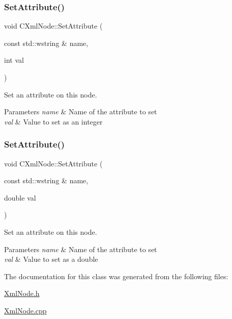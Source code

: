 \subsubsection{\texorpdfstring{Set\+Attribute()}{SetAttribute()}\hspace{0.1cm}{\footnotesize\ttfamily [2/3]}}
{\footnotesize\ttfamily void C\+Xml\+Node\+::\+Set\+Attribute (\begin{DoxyParamCaption}\item[{const std\+::wstring \&}]{name,  }\item[{int}]{val }\end{DoxyParamCaption})}



Set an attribute on this node. 


\begin{DoxyParams}{Parameters}
{\em name} & Name of the attribute to set \\
\hline
{\em val} & Value to set as an integer \\
\hline
\end{DoxyParams}
\mbox{\label{classxmlnode_1_1_c_xml_node_a1bfd97eb8de5e6f769b5ed29039b91ea}} 
\subsubsection{\texorpdfstring{Set\+Attribute()}{SetAttribute()}\hspace{0.1cm}{\footnotesize\ttfamily [3/3]}}
{\footnotesize\ttfamily void C\+Xml\+Node\+::\+Set\+Attribute (\begin{DoxyParamCaption}\item[{const std\+::wstring \&}]{name,  }\item[{double}]{val }\end{DoxyParamCaption})}



Set an attribute on this node. 


\begin{DoxyParams}{Parameters}
{\em name} & Name of the attribute to set \\
\hline
{\em val} & Value to set as a double \\
\hline
\end{DoxyParams}


The documentation for this class was generated from the following files\+:\begin{DoxyCompactItemize}
\item 
\mbox{\hyperlink{_xml_node_8h}{Xml\+Node.\+h}}\item 
\mbox{\hyperlink{_xml_node_8cpp}{Xml\+Node.\+cpp}}\end{DoxyCompactItemize}

